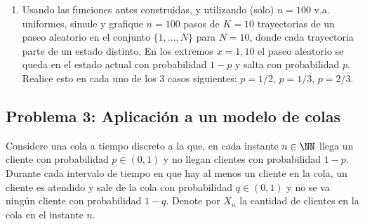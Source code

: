 \begin{enumerate}
	\item Usando las funciones antes construidas, y utilizando (solo)  $n=100$ v.a. uniformes,   simule y grafique $n=100$ pasos de  $K=10$ trayectorias de un paseo aleatorio en el conjunto $\{1,...,N\}$ para $N=10$, donde cada trayectoria parte de  un estado distinto. En los extremos $x=1,10$ el paseo aleatorio se queda en el estado actual con probabilidad $1-p$ y salta con probabilidad $p$.  Realice esto  en cada uno de  los 3 casos siguientes: 	 $p=1/2$, $p=1/3$, $p= 2/3$.
\end{enumerate}

\subsection*{Problema 3: Aplicación a un modelo de colas}

Considere una cola a tiempo discreto a la que, en cada instante $n\in \NN$ llega un cliente con probabilidad $p\in (0,1)$ y no llegan clientes con probabilidad $1-p$. Durante cada intervalo de tiempo en que hay al menos un cliente en la cola, un cliente es atendido y sale de la cola con probabilidad $q\in (0,1)$ y no se va ningún cliente con probabilidad $1-q$. Denote por $X_n$ la cantidad de clientes en la cola en el instante $n$.

